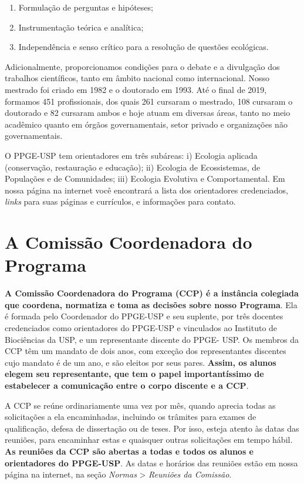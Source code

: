 \documentclass[twoside a4paper 12pt]{report}
\begin{document}
\begin{enumerate}
\item Formulação de perguntas e hipóteses;
\item Instrumentação teórica e analítica;
\item Independência e senso crítico para a resolução de questões ecológicas.
\end{enumerate}

Adicionalmente, proporcionamos condições para o debate e a divulgação
dos trabalhos científicos, tanto em âmbito nacional como internacional.
Nosso mestrado foi criado em 1982 e o doutorado em 1993. Até o final de
2019, formamos 451 profissionais, dos quais 261 cursaram o mestrado, 108
cursaram o doutorado e 82 cursaram ambos e hoje atuam em diversas áreas,
tanto no meio acadêmico quanto em órgãos governamentais, setor privado e
organizações não governamentais.

O PPGE-USP tem orientadores em três subáreas: i) Ecologia aplicada
(conservação, restauração e educação); ii) Ecologia de Ecossistemas, de
Populações e de Comunidades; iii) Ecologia Evolutiva e Comportamental.
Em nossa página na internet você encontrará a lista dos orientadores
credenciados, \emph{links} para suas páginas e currículos, e informações
para contato.


\section{A Comissão Coordenadora do Programa}
\label{sec:CCP}

\textbf{A Comissão Coordenadora do Programa (CCP) é a instância
colegiada que coordena, normatiza e toma as decisões sobre nosso
Programa}. Ela é formada pelo Coordenador do PPGE-USP e seu suplente,
por três docentes credenciados como orientadores do PPGE-USP e
vinculados ao Instituto de Biociências da USP, e um representante
discente do PPGE- USP. Os membros da CCP têm um mandato de dois anos,
com exceção dos representantes discentes cujo mandato é de um ano, e são
eleitos por seus pares. \textbf{Assim, os alunos elegem seu
representante, que tem o papel importantíssimo de estabelecer a
comunicação entre o corpo discente e a CCP}.

A CCP se reúne ordinariamente uma vez por mês, quando aprecia todas as
solicitações a ela encaminhadas, incluindo os trâmites para exames de
qualificação, defesa de dissertação ou de teses. Por isso, esteja atento
às datas das reuniões, para encaminhar estas e quaisquer outras
solicitações em tempo hábil. \textbf{As reuniões da CCP são abertas a
todas e todos os alunos e orientadores do PPGE-USP}. As datas e horários
das reuniões estão em nossa página na internet, na seção \emph{Normas}
\textgreater{} \emph{Reuniões da Comissão}.
\end{document}
